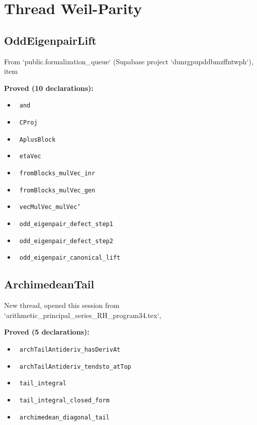 \documentclass{report}
\theoremstyle{definition}
\begin{document}
\section{Thread Weil-Parity}

\subsection{OddEigenpairLift}
From `public.formalization\_queue` (Supabase project `dunrgpupddbmzffntwph`), item

\noindent\textbf{Proved (10 declarations):}
\begin{itemize}
  \item {}\leanok\ \texttt{and}
  \item {}\leanok\ \texttt{CProj}
  \item {}\leanok\ \texttt{AplusBlock}
  \item {}\leanok\ \texttt{etaVec}
  \item {}\leanok\ \texttt{fromBlocks\_mulVec\_inr}
  \item {}\leanok\ \texttt{fromBlocks\_mulVec\_gen}
  \item {}\leanok\ \texttt{vecMulVec\_mulVec'}
  \item {}\leanok\ \texttt{odd\_eigenpair\_defect\_step1}
  \item {}\leanok\ \texttt{odd\_eigenpair\_defect\_step2}
  \item {}\leanok\ \texttt{odd\_eigenpair\_canonical\_lift}
\end{itemize}

\subsection{ArchimedeanTail}
New thread, opened this session from `arithmetic\_principal\_series\_RH\_program34.tex`,

\noindent\textbf{Proved (5 declarations):}
\begin{itemize}
  \item {}\leanok\ \texttt{archTailAntideriv\_hasDerivAt}
  \item {}\leanok\ \texttt{archTailAntideriv\_tendsto\_atTop}
  \item {}\leanok\ \texttt{tail\_integral}
  \item {}\leanok\ \texttt{tail\_integral\_closed\_form}
  \item {}\leanok\ \texttt{archimedean\_diagonal\_tail}
\end{itemize}
\end{document}
